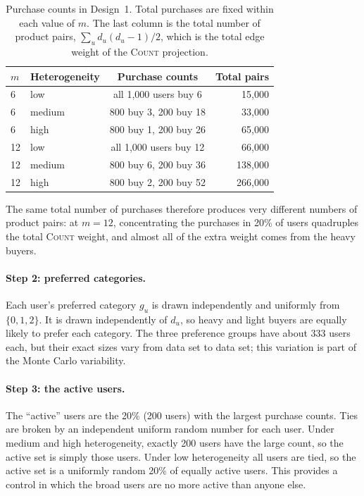 \documentclass[12pt]{article}
\newcommand{\Count}{\textsc{Count}}
\begin{document}
\begin{table}[ht]
  \centering
  \caption{Purchase counts in Design~1. Total purchases are fixed within each value of $m$. The last column is the total number of product pairs, $\sum_u d_u(d_u-1)/2$, which is the total edge weight of the \Count{} projection.}
  \label{tab:gen-counts}
  \small
  \begin{tabular}{@{}llcr@{}}
    \toprule
    $m$ & Heterogeneity & Purchase counts & Total pairs \\
    \midrule
    6  & low    & all 1{,}000 users buy 6        & 15{,}000 \\
    6  & medium & 800 buy 3, 200 buy 18          & 33{,}000 \\
    6  & high   & 800 buy 1, 200 buy 26          & 65{,}000 \\
    \midrule
    12 & low    & all 1{,}000 users buy 12       & 66{,}000 \\
    12 & medium & 800 buy 6, 200 buy 36          & 138{,}000 \\
    12 & high   & 800 buy 2, 200 buy 52          & 266{,}000 \\
    \bottomrule
  \end{tabular}
\end{table}

The same total number of purchases therefore produces very different numbers of product pairs: at $m=12$, concentrating the purchases in 20\% of users quadruples the total \Count{} weight, and almost all of the extra weight comes from the heavy buyers.

\paragraph{Step 2: preferred categories.} Each user's preferred category $g_u$ is drawn independently and uniformly from $\{0,1,2\}$. It is drawn independently of $d_u$, so heavy and light buyers are equally likely to prefer each category. The three preference groups have about 333 users each, but their exact sizes vary from data set to data set; this variation is part of the Monte Carlo variability.

\paragraph{Step 3: the active users.} The ``active'' users are the 20\% (200 users) with the largest purchase counts. Ties are broken by an independent uniform random number for each user. Under medium and high heterogeneity, exactly 200 users have the large count, so the active set is simply those users. Under low heterogeneity all users are tied, so the active set is a uniformly random 20\% of equally active users. This provides a control in which the broad users are no more active than anyone else.
\end{document}
